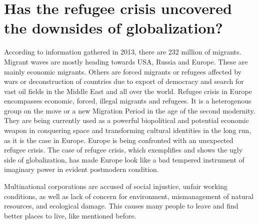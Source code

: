 \section{Has the refugee crisis uncovered the downsides of \mbox{globalization}?}

According to information gathered in 2013, there are 232 million of migrants. Migrant waves are mostly heading towards USA, Russia and Europe. These are mainly economic migrants. Others are forced migrants or refugees affected by wars or deconstruction of countries due to export of democracy and search for vast oil fields in the Middle East and all over the world. Refugee crisis in Europe encompasses economic, forced, illegal migrants and refugees. It is a heterogenous group on the move or a new Migration Period in the age of the second modernity. They are being currently used as a powerful biopolitical and potential economic weapon in conquering space and transforming cultural identities in the long run, as it is the case in Europe. Europe is being confronted with an unexpected refugee crisis. The case of refugee crisis, which exemplifies and shows the ugly side of globalization, has made Europe look like a bad tempered instrument of imaginary power in evident postmodern condition.

Multinational corporations are accused of social injustice, unfair working conditions, as well as lack of concern for environment, mismanagement of natural resources, and ecological damage. This causes many people to leave and find better places to live, like mentioned before.

